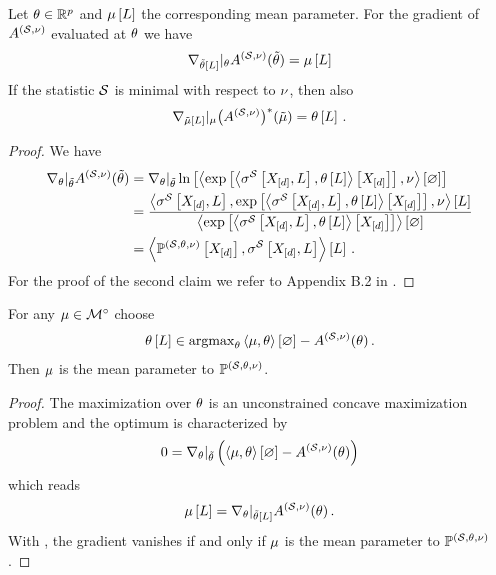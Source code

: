\begin{lemma}
    \label{lem:gradientCumfunction}
    Let $\theta\in\mathbb{R}^{p}$ and $\mu\left[L\right]$ the corresponding mean parameter.
    For the gradient of $A^{(\mathcal{S},\nu)}$ evaluated at $\theta$ we have
    \begin{align*}
        \nabla_{\tilde{\theta}\left[L\right]}|_{\theta} A^{(\mathcal{S},\nu)}(\tilde{\theta}) = \mu\left[L\right]
    \end{align*}
    If the statistic $\mathcal{S}$ is minimal with respect to $\nu$, then also
    \begin{align*}
        \nabla_{\tilde{\mu}\left[L\right]}|_{\mu} \big(A^{(\mathcal{S},\nu)}\big)^*(\tilde{\mu})
        = \theta\left[L\right] \, .
    \end{align*}
\end{lemma}
\begin{proof}
    We have
    \begin{align*}
        \nabla_{\theta}|_{\tilde{\theta}} A^{(\mathcal{S},\nu)}(\tilde{\theta})
        & = \nabla_{\theta}|_{\tilde{\theta}} \ln \left[ \left\langle \mathrm{exp}\left[\left\langle \sigma^{\mathcal{S}}\left[X_{[d]},L\right],\theta\left[L\right]\right\rangle \left[ X_{[d]} \right]\right],\nu\right\rangle \left[ \varnothing \right] \right] \\
        & = \frac{
            \left\langle \sigma^{\mathcal{S}}\left[X_{[d]},L\right],\mathrm{exp}\left[\left\langle \sigma^{\mathcal{S}}\left[X_{[d]},L\right],\theta\left[L\right]\right\rangle \left[ X_{[d]} \right]\right],\nu\right\rangle \left[ L \right]
        }{\left\langle \mathrm{exp}\left[\left\langle \sigma^{\mathcal{S}}\left[X_{[d]},L\right],\theta\left[L\right]\right\rangle \left[ X_{[d]} \right]\right]\right\rangle \left[ \varnothing \right]}  \\
        & = \left\langle \mathbb{P}^{(\mathcal{S},\theta,\nu)}\left[X_{[d]}\right],\sigma^{\mathcal{S}}\left[X_{[d]},L\right]\right\rangle \left[ L \right] \, .
    \end{align*}
    For the proof of the second claim we refer to Appendix B.2 in \cite{wainwright_graphical_2008}.
\end{proof}

\begin{theorem}
    For any $\mu\in{\mathcal{M}}^{\circ}$ choose
    \begin{align*}
        \theta\left[L\right] \in \mathrm{argmax}_{\theta} \left\langle \mu,\theta\right\rangle \left[ \varnothing \right] - A^{(\mathcal{S},\nu)}(\theta) \, .
    \end{align*}
    Then $\mu$ is the mean parameter to $\mathbb{P}^{(\mathcal{S},\theta,\nu)}$.
\end{theorem}
\begin{proof}
    The maximization over $\theta$ is an unconstrained concave maximization problem and the optimum is characterized by
    \begin{align*}
        0 = \nabla_{\theta}|_{\tilde{\theta}}\left(\left\langle \mu,\theta\right\rangle \left[ \varnothing \right] - A^{(\mathcal{S},\nu)}(\theta)\right)
    \end{align*}
    which reads
    \begin{align*}
        \mu\left[L\right] = \nabla_{\theta}|_{\tilde{\theta}[L]} A^{(\mathcal{S},\nu)}(\theta) \, .
    \end{align*}
    With , the gradient vanishes if and only if $\mu$ is the mean parameter to $\mathbb{P}^{(\mathcal{S},\theta,\nu)}$.
\end{proof}

